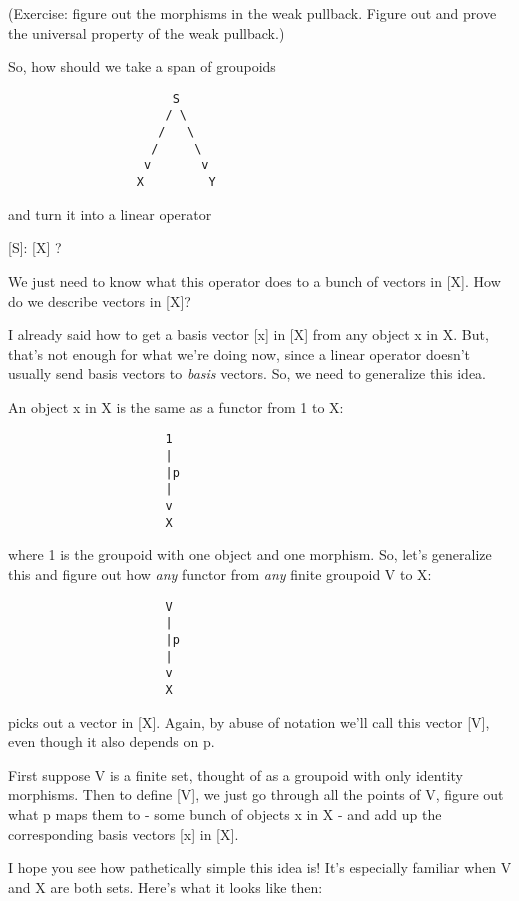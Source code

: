 (Exercise: figure out the morphisms in the weak pullback.  Figure 
out and prove the universal property of the weak pullback.)

So, how should we take a span of groupoids 

\begin{verbatim}
                       S
                      / \
                     /   \
                    /     \
                   v       v
                  X         Y
\end{verbatim}
    
and turn it into a linear operator 

[S]: [X] \to  [Y] ?

We just need to know what this operator does to a bunch of
vectors in [X].  How do we describe vectors in [X]?  

I already said how to get a basis vector [x] in [X] from any object
x in X.  But, that's not enough for what we're doing now, since a 
linear operator doesn't usually send basis vectors to \emph{basis}
vectors.  So, we need to generalize this idea.

An object x in X is the same as a functor from 1 to X:

\begin{verbatim}
                      1
                      |
                      |p
                      |
                      v
                      X
\end{verbatim}
    
where 1 is the groupoid with one object and one morphism.  So, 
let's generalize this and figure out how \emph{any} functor from 
\emph{any} finite groupoid V to X:

\begin{verbatim}
                      V
                      |
                      |p
                      |
                      v
                      X
\end{verbatim}
    
picks out a vector in [X].  Again, by abuse of notation we'll
call this vector [V], even though it also depends on p.

First suppose V is a finite set, thought of as a groupoid with
only identity morphisms.  Then to define [V], we just go through 
all the points of V, figure out what p maps them to - some bunch 
of objects x in X - and add up the corresponding basis vectors 
[x] in [X].

I hope you see how pathetically simple this idea is!  It's especially
familiar when V and X are both sets.  Here's what it looks like then:

